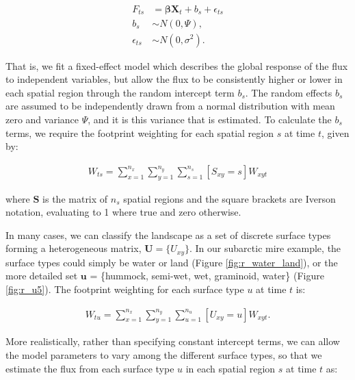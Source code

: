 \begin{equation}
   \label{eq:mixed}

\begin{split}
  F_{ts} &= \boldsymbol{\beta} \mathbf{X}_t + b_s + \epsilon_{ts} \\
  b_s & \sim N(0, \Psi), \\
  \epsilon_{ts} & \sim N(0, \sigma^2).

\end{split}

\end{equation}

That is, we fit a fixed-effect model which describes the global response
of the flux to independent variables, but allow the flux to be
consistently higher or lower in each spatial region through the random
intercept term \(b_s\). The random effects \(b_s\) are assumed to be
independently drawn from a normal distribution with mean zero and
variance \(\Psi\), and it is this variance that is estimated. To
calculate the \(b_s\) terms, we require the footprint weighting for each
spatial region \(s\) at time \(t\), given by:

\begin{align}
   \label{eq:sWtMean} 
  W_{ts} = \sum_{x = 1}^{n_x} \sum_{y = 1}^{n_y}  \sum_{s = 1}^{n_s} [S_{xy} = s] W_{xyt}

\end{align}

where \(\mathbf{S}\) is the matrix of \(n_s\) spatial regions and the
square brackets are Iverson notation, evaluating to 1 where true and
zero otherwise.

In many cases, we can classify the landscape as a set of discrete
surface types forming a heterogeneous matrix,
\(\mathbf{U} = \{U_{xy}\}\). In our subarctic mire example, the surface
types could simply be water or land (Figure \ref{fig:r_water_land}), or
the more detailed set \(\mathbf{u}\) = \{hummock, semi-wet, wet,
graminoid, water\} (Figure \ref{fig:r_u5}). The footprint weighting for
each surface type \(u\) at time \(t\) is:

\begin{align}
   \label{eq:uWtMean} 
  W_{tu} = \sum_{x = 1}^{n_x} \sum_{y = 1}^{n_y}  \sum_{u = 1}^{n_u} [U_{xy} = u] W_{xyt}.

\end{align}

More realistically, rather than specifying constant intercept terms, we
can allow the model parameters to vary among the different surface
types, so that we estimate the flux from each surface type \(u\) in each
spatial region \(s\) at time \(t\) as:

